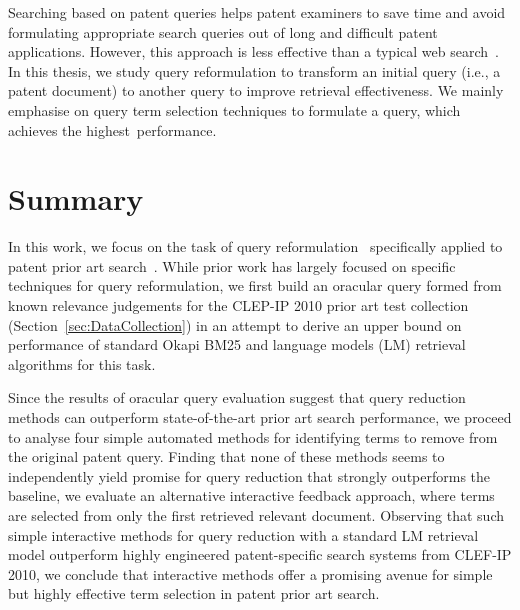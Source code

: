 Searching based on patent queries helps patent examiners to save time and avoid 
formulating appropriate search queries out of long and difficult patent applications. 
 However, this approach is less effective than a typical web search~\citep{lupu2013patent}. 
 In this thesis, we study query reformulation to transform an initial query (i.e., a patent document) to another query to improve retrieval effectiveness. We mainly emphasise on query term selection techniques to formulate a query, which achieves the highest~performance.


\section{Summary}
\label{sec:summary}
In this work, we focus on the task of query
reformulation~\citep{Baeza-Yates2011} specifically applied to patent
prior art
search~\citep{mahdabi2014patent,Piroi2010,xue2009transforming}. While
prior work has largely focused on specific techniques for query
reformulation, 
 we first
build an oracular query formed from known relevance judgements for the
CLEP-IP 2010 prior art test collection~\citep{Piroi2010} (Section~\ref{sec:DataCollection}) in an attempt
to derive an upper bound on performance of standard Okapi BM25 and
language models (LM) retrieval algorithms for this task.  

Since the
results of oracular query evaluation suggest that query reduction methods can
outperform state-of-the-art prior art search performance, 
we proceed to analyse four simple
automated methods for identifying terms to remove from the original
patent query.  Finding that none of these methods seems to
independently yield promise for query reduction that strongly
outperforms the baseline, 
we evaluate an alternative
interactive feedback approach, where terms are selected from only the
first retrieved relevant document.  Observing that such simple
interactive methods for query reduction with a standard LM retrieval
model outperform highly engineered patent-specific search systems from
CLEF-IP 2010, we conclude that interactive methods offer a promising
avenue for simple but highly effective term selection in patent prior
art search.

